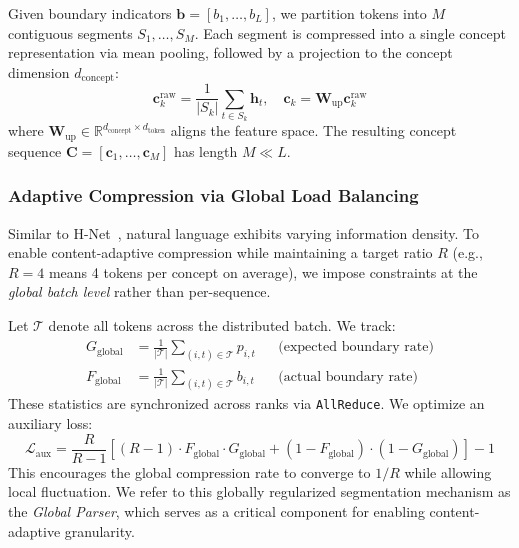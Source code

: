 Given boundary indicators $\mathbf{b} = [b_1, \dots, b_L]$, we partition tokens into $M$ contiguous segments $S_1, \dots, S_M$. Each segment is compressed into a single concept representation via mean pooling, followed by a projection to the concept dimension $d_{\text{concept}}$:
\begin{equation}
    \mathbf{c}_k^{\text{raw}} = \frac{1}{|S_k|} \sum_{t \in S_k} \mathbf{h}_t, \quad \mathbf{c}_k = \mathbf{W}_{\text{up}}\mathbf{c}_k^{\text{raw}}
\end{equation}
where $\mathbf{W}_{\text{up}} \in \mathbb{R}^{d_{\text{concept}} \times d_{\text{token}}}$ aligns the feature space. The resulting concept sequence $\mathbf{C} = [\mathbf{c}_1, \dots, \mathbf{c}_M]$ has length $M \ll L$.

\subsubsection{Adaptive Compression via Global Load Balancing}
\label{sec:adaptive_compression}

Similar to H-Net~\cite{hwang2025dynamicchunkingendtoendhierarchical}, natural language exhibits varying information density. To enable content-adaptive compression while maintaining a target ratio $R$ (e.g., $R=4$ means 4 tokens per concept on average), we impose constraints at the \emph{global batch level} rather than per-sequence.

Let $\mathcal{T}$ denote all tokens across the distributed batch. We track:
\begin{align}
    G_{\text{global}} &= \frac{1}{|\mathcal{T}|} \sum_{(i,t) \in \mathcal{T}} p_{i,t} && \text{(expected boundary rate)} \\
    F_{\text{global}} &= \frac{1}{|\mathcal{T}|} \sum_{(i,t) \in \mathcal{T}} b_{i,t} && \text{(actual boundary rate)}
\end{align}
These statistics are synchronized across ranks via \texttt{AllReduce}. We optimize an auxiliary loss:
\begin{equation}
    \mathcal{L}_{\text{aux}} = \frac{R}{R-1} \left[ (R-1) \cdot F_{\text{global}} \cdot G_{\text{global}} + (1 - F_{\text{global}}) \cdot (1 - G_{\text{global}}) \right] - 1
\end{equation}
This encourages the global compression rate to converge to $1/R$ while allowing local fluctuation. We refer to this globally regularized segmentation mechanism as the \textit{Global Parser}, which serves as a critical component for enabling content-adaptive granularity.

